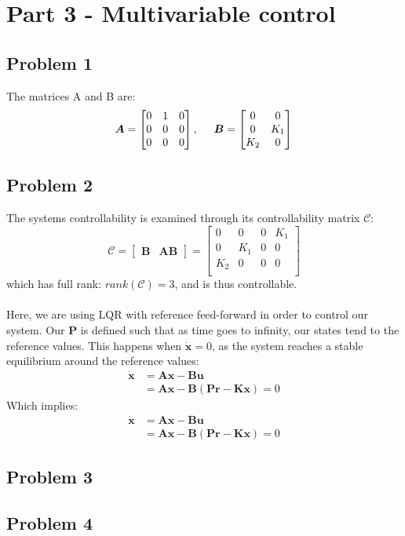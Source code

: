 

\section{Part 3 - Multivariable control}
\subsection{Problem 1}
The matrices A and B are:
\begin{equation}
\boldsymbol{A} = \begin{bmatrix}
0 & 1 & 0 \\
0 & 0 & 0 \\
0 & 0 & 0 \\
\end{bmatrix}, \hspace{0.5cm}
\boldsymbol{B} = \begin{bmatrix}
0 & 0 \\
0 & K_1 \\
K_2 & 0 \\
\end{bmatrix}
\end{equation}

\subsection{Problem 2}
The systems controllability is examined through its controllability matrix $\boldsymbol{\mathcal{C}}$:
\begin{equation}
\boldsymbol{\mathcal{C}} = \begin{bmatrix}
\boldsymbol{B} & \boldsymbol{AB}
\end{bmatrix}
=
\begin{bmatrix}
0 & 0 & 0 & K_1 \\
0 & K_1 & 0 & 0 \\
K_2 & 0 & 0 & 0 \\
\end{bmatrix}
\end{equation}
which has full rank: $rank(\boldsymbol{\mathcal{C}}) = 3$, and is thus controllable.
\\
\\
Here, we are using LQR with reference feed-forward in order to control our system. Our $\boldsymbol{P}$ is defined such that as time goes to infinity, our states tend to the reference values. This happens when $\dot{\boldsymbol{x}} = 0$, as the system reaches a stable equilibrium around the reference values:
\begin{align*}
\dot{\boldsymbol{x}} &= \boldsymbol{Ax} - \boldsymbol{Bu} \\
										 &= \boldsymbol{Ax} - \boldsymbol{B}(\boldsymbol{Pr} - \boldsymbol{Kx}) = 0
\end{align*}
Which implies:
\begin{align*}
\dot{\boldsymbol{x}} &= \boldsymbol{Ax} - \boldsymbol{Bu} \\
										 &= \boldsymbol{Ax} - \boldsymbol{B}(\boldsymbol{Pr} - \boldsymbol{Kx}) = 0
\end{align*}
\subsection{Problem 3}
\subsection{Problem 4}